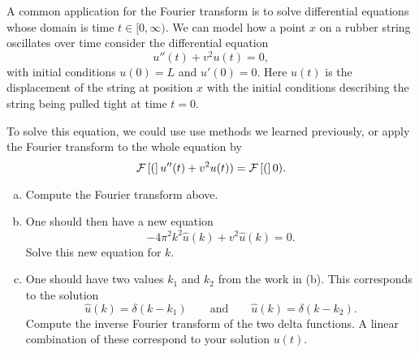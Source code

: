 \documentclass[12pt]{article} %
\begin{document}
\begin{problem}
A common application for the Fourier transform is to solve differential equations whose domain is time $t\in [0,\infty)$. We can model how a point $x$ on a rubber string oscillates over time consider the differential equation
\[
u''(t)+v^2u(t)=0,
\]
with initial conditions $u(0)=L$ and $u'(0)=0$. Here $u(t)$ is the displacement of the string at position $x$ with the initial conditions describing the string being pulled tight at time $t=0$.
\begin{figure}[H]
	\centering
	\def\svgwidth{\columnwidth}
	
\end{figure}
To solve this equation, we could use use methods we learned previously, or apply the Fourier transform to the whole equation by
\[
\mathcal{F}\left[ ( \right]u''(t)+v^2u(t))=\mathcal{F}\left[ ( \right]0).
\]
\begin{enumerate}[(a)]
	\item Compute the Fourier transform above.
	\item One should then have a new equation
	\[
	-4\pi^2k^2\hat{u}(k)+v^2\hat{u}(k)=0.
	\]
	Solve this new equation for $k$.
	\item One should have two values $k_1$ and $k_2$ from the work in (b).  This corresponds to the solution
	\[
	\hat{u}(k)=\delta(k-k_1) \qquad \textrm{and} \qquad \hat{u}(k)=\delta(k-k_2).
	\]
	Compute the inverse Fourier transform of the two delta functions. A linear combination of these correspond to your solution $u(t)$.
\end{enumerate}
\end{problem}
\end{document}
